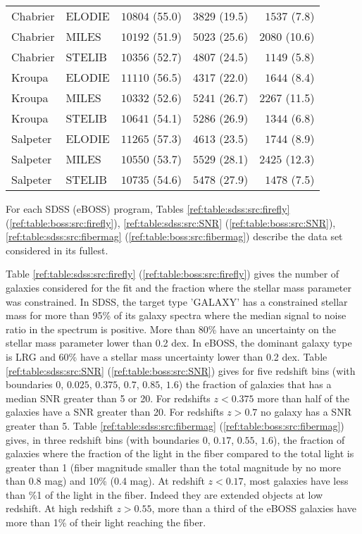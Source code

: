 \documentclass[onecolumn]{aa}
\begin{document}
\begin{table*}
\begin{center}
\begin{tabular}{ll rrr}
Chabrier & ELODIE & $10804$ (55.0) & $3829$ (19.5) & $1537$ (7.8) \\ 
Chabrier & MILES & $10192$ (51.9) & $5023$ (25.6) & $2080$ (10.6) \\ 
Chabrier & STELIB & $10356$ (52.7) & $4807$ (24.5) & $1149$ (5.8) \\ 
Kroupa & ELODIE & $11110$ (56.5) & $4317$ (22.0) & $1644$ (8.4) \\ 
Kroupa & MILES & $10332$ (52.6) & $5241$ (26.7) & $2267$ (11.5) \\ 
Kroupa & STELIB & $10641$ (54.1) & $5286$ (26.9) & $1344$ (6.8) \\ 
Salpeter & ELODIE & $11265$ (57.3) & $4613$ (23.5) & $1744$ (8.9) \\ 
Salpeter & MILES & $10550$ (53.7) & $5529$ (28.1) & $2425$ (12.3) \\ 
Salpeter & STELIB & $10735$ (54.6) & $5478$ (27.9) & $1478$ (7.5) \\ 

\hline
\end{tabular}
\end{center}
\end{table*}


For each SDSS (eBOSS) program, Tables 
\ref{ref:table:sdss:src:firefly}
(\ref{ref:table:boss:src:firefly}), 
\ref{ref:table:sdss:src:SNR} 
(\ref{ref:table:boss:src:SNR}), 
\ref{ref:table:sdss:src:fibermag} 
(\ref{ref:table:boss:src:fibermag}) 
describe the data set considered in its fullest. 

Table 
\ref{ref:table:sdss:src:firefly} (\ref{ref:table:boss:src:firefly})
gives the number of galaxies considered for the fit and the fraction where the stellar mass parameter was constrained. 
In SDSS, the target type 'GALAXY' has a constrained stellar mass for more than 95\% of its galaxy spectra where the median signal to noise ratio in the spectrum is positive. 
More than 80\% have an uncertainty on the stellar mass parameter lower than 0.2 dex. 
In eBOSS, the dominant galaxy type is LRG and 60\% have a stellar mass uncertainty lower than 0.2 dex. 
Table 
\ref{ref:table:sdss:src:SNR} (\ref{ref:table:boss:src:SNR}) 
gives for five redshift bins (with boundaries $0$, $0.025$, $0.375$, $0.7$, $0.85$, $1.6$) the fraction of galaxies that has a median SNR greater than 5 or 20. For redshifts $z<0.375$ more than half of the galaxies have a SNR greater than 20. For redshifts $z>0.7$ no galaxy has a SNR greater than 5. 
Table 
\ref{ref:table:sdss:src:fibermag} (\ref{ref:table:boss:src:fibermag}) 
gives, in three redshift bins (with boundaries $0$, $0.17$,  $0.55$, $1.6$), the fraction of galaxies where the fraction of the light in the fiber compared to the total light is greater than 1 (fiber magnitude smaller than the total magnitude by no more than 0.8 mag) and 10\% (0.4 mag). At redshift $z<0.17$, most galaxies have less than \%1 of the light in the fiber. Indeed they are extended objects at low redshift. 
At high redshift $z>0.55$, more than a third of the eBOSS galaxies have more than 1\% of their light reaching the fiber.
\end{document}
